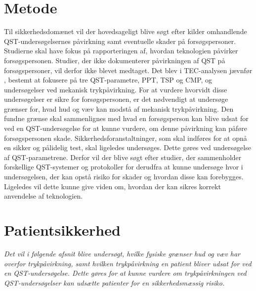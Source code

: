 \section{Metode}
Til sikkerhedsdomænet vil der hovedsageligt blive søgt efter kilder omhandlende QST-undersøgelsernes påvirkning samt eventuelle skader på forsøgspersoner. Studierne skal have fokus på rapporteringen af, hvordan teknologien påvirker forsøgspersonen. Studier, der ikke dokumenterer påvirkningen af QST på forsøgspersoner, vil derfor ikke blevet medtaget. Det blev i TEC-analysen jævnfør , bestemt at fokusere på tre QST-parametre, PPT, TSP og CMP, og undersøgelser ved mekanisk trykpåvirkning. For at vurdere hvorvidt disse undersøgelser er sikre for forsøgspersonen, er det nødvendigt at undersøge grænser for, hvad hud og væv kan modstå af mekanisk trykpåvirkning. Den fundne grænse skal sammenlignes med hvad en forsøgsperson kan blive udsat for ved en QST-undersøgelse for at kunne vurdere, om denne påvirkning kan påføre forsøgspersonen skade. Sikkerhedsforanstaltninger, som skal indføres for at opnå en sikker og pålidelig test, skal ligeledes undersøges. Dette gøres ved undersøgelse af QST-parametrene. Derfor vil der blive søgt efter studier, der sammenholder forskellige QST-systemer og protokoller for derudfra at kunne undersøge hvor i undersøgelsen, der kan opstå risiko for skader og hvordan disse kan forebygges. Ligeledes vil dette kunne give viden om, hvordan der kan sikres korrekt anvendelse af teknologien. \citep{HTAcore}

\section{Patientsikkerhed}
\textit{Det vil i følgende afsnit blive undersøgt, hvilke fysiske grænser hud og væv har overfor trykpåvirkning, samt hvilken trykpåvirkning en patient bliver udsat for ved en QST-undersøgelse. Dette gøres for at kunne vurdere om trykpåvirkningen ved QST-undersøgelser kan udsætte patienter for en sikkerhedsmæssig risiko.}

